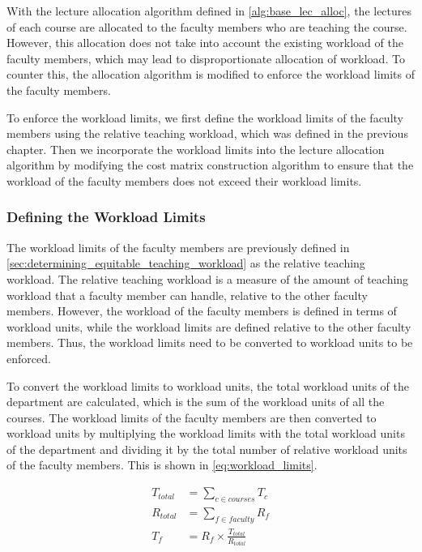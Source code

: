With the lecture allocation algorithm defined in \autoref{alg:base_lec_alloc}, the lectures of each course are allocated to the faculty members who are teaching the course. However, this allocation does not take into account the existing workload of the faculty members, which may lead to disproportionate allocation of workload. To counter this, the allocation algorithm is modified to enforce the workload limits of the faculty members.

To enforce the workload limits, we first define the workload limits of the faculty members using the relative teaching workload, which was defined in the previous chapter. Then we incorporate the workload limits into the lecture allocation algorithm by modifying the cost matrix construction algorithm to ensure that the workload of the faculty members does not exceed their workload limits.

\subsubsection{Defining the Workload Limits}

The workload limits of the faculty members are previously defined in \autoref{sec:determining_equitable_teaching_workload} as the relative teaching workload. The relative teaching workload is a measure of the amount of teaching workload that a faculty member can handle, relative to the other faculty members. However, the workload of the faculty members is defined in terms of workload units, while the workload limits are defined relative to the other faculty members. Thus, the workload limits need to be converted to workload units to be enforced.

To convert the workload limits to workload units, the total workload units of the department are calculated, which is the sum of the workload units of all the courses. The workload limits of the faculty members are then converted to workload units by multiplying the workload limits with the total workload units of the department and dividing it by the total number of relative workload units of the faculty members. This is shown in \autoref{eq:workload_limits}.

\begin{equation}
  \label{eq:workload_limits}
  \begin{aligned}
    T_{total} & = \sum_{c \in courses} T_c               \\
    R_{total} & = \sum_{f \in faculty} R_f               \\
    T_f       & = R_f \times \frac{T_{total}}{R_{total}}
  \end{aligned}
\end{equation}

